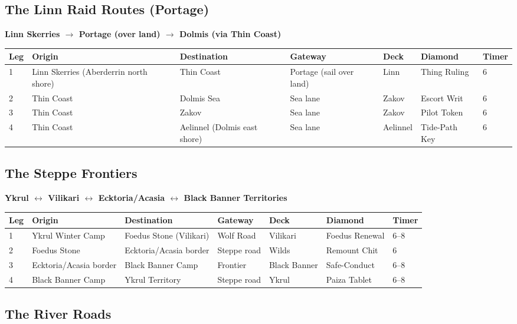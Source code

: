 \documentclass[12pt,oneside]{book}
\begin{document}
\subsection{The Linn Raid Routes (Portage)}

\textbf{Linn Skerries $\rightarrow$ Portage (over land) $\rightarrow$ Dolmis (via Thin Coast)}

\begin{longtable}{|p{1.5cm}|p{2.5cm}|p{2.5cm}|p{1.5cm}|p{2cm}|p{1.5cm}|}
\hline
\textbf{Leg} & \textbf{Origin} & \textbf{Destination} & \textbf{Gateway} & \textbf{Deck} & \textbf{Diamond} & \textbf{Timer} \\
 & Linn Skerries (Aberderrin north shore) & Thin Coast & Portage (sail over land) & Linn & Thing Ruling & 6 \\
2 & Thin Coast & Dolmis Sea & Sea lane & Zakov & Escort Writ & 6 \\
3 & Thin Coast & Zakov & Sea lane & Zakov & Pilot Token & 6 \\
4 & Thin Coast & Aelinnel (Dolmis east shore) & Sea lane & Aelinnel & Tide-Path Key & 6 \\
\hline
\end{longtable}

\subsection{The Steppe Frontiers}

\textbf{Ykrul $\leftrightarrow$ Vilikari $\leftrightarrow$ Ecktoria/Acasia $\leftrightarrow$ Black Banner Territories}

\begin{longtable}{|p{1.5cm}|p{2.5cm}|p{2.5cm}|p{1.5cm}|p{2cm}|p{1.5cm}|}
\hline
\textbf{Leg} & \textbf{Origin} & \textbf{Destination} & \textbf{Gateway} & \textbf{Deck} & \textbf{Diamond} & \textbf{Timer} \\
 & Ykrul Winter Camp & Foedus Stone (Vilikari) & Wolf Road & Vilikari & Foedus Renewal & 6--8 \\
2 & Foedus Stone & Ecktoria/Acasia border & Steppe road & Wilds & Remount Chit & 6 \\
3 & Ecktoria/Acasia border & Black Banner Camp & Frontier & Black Banner & Safe-Conduct & 6--8 \\
4 & Black Banner Camp & Ykrul Territory & Steppe road & Ykrul & Paiza Tablet & 6--8 \\
\hline
\end{longtable}

\subsection{The River Roads}
\end{document}
